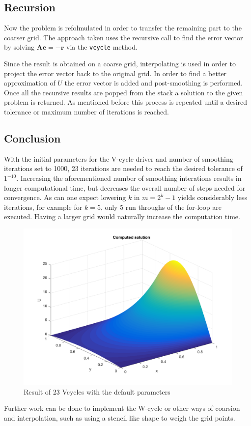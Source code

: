 \documentclass[main.tex]{subfiles}
\begin{document}
\subsection{Recursion}
Now the problem is refolmulated in order to transfer the remaining part to the coarser grid. The approach taken uses the recursive call to find the error vector by solving $\mathbf{A e} = \mathbf{-r}$ via the \texttt{vcycle} method.

Since the result is obtained on a coarse grid, interpolating is used in order to project the error vector back to the original grid. In order to find a better approximation of $U$ the error vector is added and post-smoothing is performed. Once all the recursive results are popped from the stack a solution to the given problem is returned. As mentioned before this process is repeated until a desired tolerance or maximum number of iterations is reached. 

\subsection*{Conclusion}
With the initial parameters for the V-cycle driver and number of smoothing iterations set to 1000, 23 iterations are needed to reach the desired tolerance of $1^{-10}$. Increasing the aforementioned number of smoothing interations results in longer computational time, but decreases the overall number of steps needed for convergence. As can one expect lowering $k$ in $m=2^k - 1$ yields considerably less iterations, for example for $k=5$, only 5 run throughs of the for-loop are executed. Having a larger grid would naturally increase the computation time.

\begin{figure}[h]
    \centering
    \includegraphics[width=\textwidth]{../Figures/ex33.png}
    \caption{Result of 23 Vcycles with the default parameters}
\end{figure}

Further work can be done to implement the W-cycle or other ways of coarsion and interpolation, such as using a stencil like shape to weigh the grid points.
    
\end{document}
